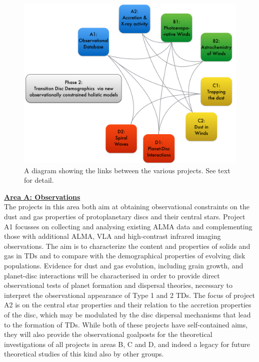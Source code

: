 \documentclass[10pt,fleqn,twoside]{article}
\newcommand{\AreacolA}{\color{blue}}
\begin{document}
\begin{figure}
\centerline{\includegraphics[width=13cm]{dependency2.jpg}}
\caption{A diagram showing the links between the various
projects. See text for detail.}

\end{figure}

\vspace{1.0em}


%
\noindent\underline{{\bf\AreacolA Area A: Observations}}\\
\noindent The projects in this area both aim at obtaining
observational constraints on the dust and gas properties of
protoplanetary discs and their central stars. Project A1 focusses on
collecting and analysing existing ALMA data and complementing those
with additional ALMA, VLA and high-contrast infrared imaging observations. 
The aim is to characterize the content and properties of solids and gas in TDs 
and to compare with the demographical properties of evolving disk populations. 
Evidence for dust and gas evolution, including grain growth,
and planet-disc interactions will be characterised in order to provide
direct observational tests of planet formation and dispersal theories,
necessary to interpret the observational appearance of Type 1 and 2
TDs. The focus of project A2 is on the central star properties and
their relation to the accretion properties of the disc, which may be
modulated by the disc dispersal mechanisms that lead to the formation
of TDs. While both of these projects have self-contained aims, they
will also provide the observational goalposts for the theoretical
investigations of all projects in areas B, C and D, and indeed a
legacy for future theoretical studies of this kind also by other
groups.  
\end{document}
